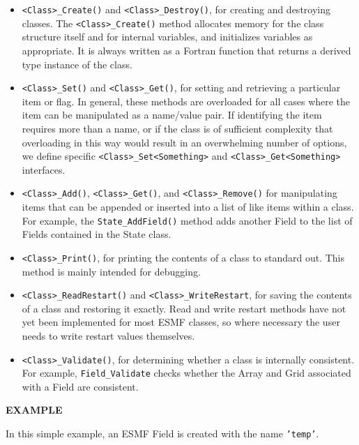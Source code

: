 \begin{itemize}

\item {\tt <Class>\_Create()} and {\tt <Class>\_Destroy()}, for creating and 
destroying classes.  The {\tt <Class>\_Create()} method allocates memory 
for the class structure itself and for internal variables, and
initializes variables as appropriate.  It is always written as a 
Fortran function that returns a derived type instance of the class.

\item {\tt <Class>\_Set()} and {\tt <Class>\_Get()}, for setting and 
retrieving a particular item or flag.  In general, these methods are
overloaded for all cases where the item can be manipulated as a
name/value pair.  If identifying the item requires more than a 
name, or if the class is of sufficient complexity that overloading
in this way would result in an overwhelming number of options, we 
define specific {\tt <Class>\_Set<Something>} and 
{\tt <Class>\_Get<Something>} interfaces.

\item {\tt <Class>\_Add()}, {\tt <Class>\_Get()}, and 
{\tt <Class>\_Remove()} for manipulating 
items that can be appended or inserted into a list of like
items within a class.  For example, the {\tt State\_AddField()}
method adds another Field to the list of Fields contained
in the State class.

\item {\tt <Class>\_Print()}, for printing the contents of a class to 
standard out.  This method is mainly intended for debugging.

\item {\tt <Class>\_ReadRestart()} and {\tt <Class>\_WriteRestart}, 
for saving the contents of a class and restoring it exactly.  Read
and write restart methods have not yet been implemented for most
ESMF classes, so where necessary the user needs to write restart 
values themselves.

\item {\tt <Class>\_Validate()}, for determining whether a class is 
internally consistent.  For example, {\tt Field\_Validate} checks 
whether the Array and Grid associated with a Field are consistent.

\end{itemize}

{\bf EXAMPLE}

In this simple example, an ESMF Field is created with the 
name {\tt 'temp'}.  

